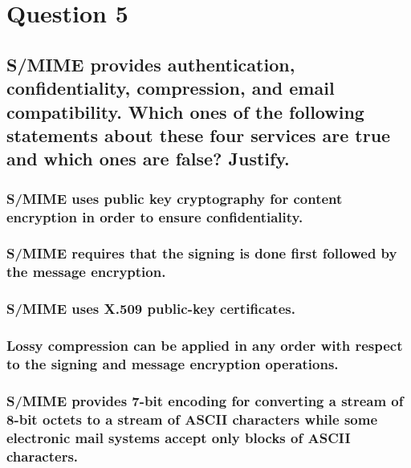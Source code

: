 \documentclass{report}
\begin{document}
	\section{Question 5}
	\startsection
		\renewcommand{\thesubsection}{\thesection.\Alph{subsection}}
		\subsection{S/MIME provides authentication, confidentiality, compression, and email compatibility. Which ones of the following statements about these four services are true and which ones are false? Justify.}
		\startsubsection
			\subsubsection{S/MIME uses public key cryptography for content encryption in order to ensure confidentiality.}
			\startsubsection
			\closesection
			\subsubsection{S/MIME requires that the signing is done first followed by the message encryption.}
			\startsubsection
			\closesection
			\subsubsection{S/MIME uses X.509 public-key certificates.}
			\startsubsection
			\closesection
			\subsubsection{Lossy compression can be applied in any order with respect to the signing and message encryption operations.}
			\startsubsection
			\closesection
			\subsubsection{S/MIME provides 7-bit encoding for converting a stream of 8-bit octets to a stream of ASCII characters while some electronic mail systems accept only blocks of ASCII characters.}
			\startsubsection
			\closesection
		\closesection
	\closesection
\end{document}
